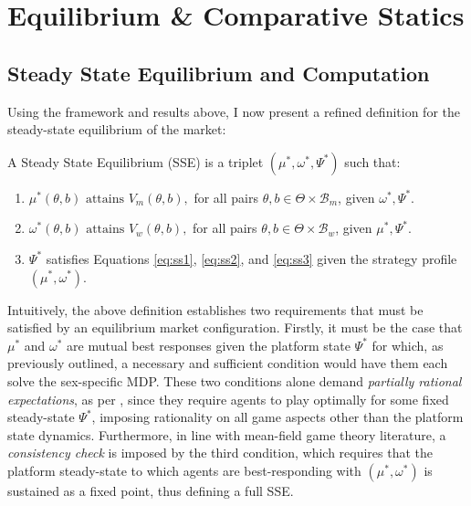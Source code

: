 \section{Equilibrium \& Comparative Statics}
\label{sec:section3} 
\subsection{Steady State Equilibrium and Computation}\label{sec:section3.1} 
Using the framework and results above, I now present a refined definition for the steady-state equilibrium of the market: 
\begin{definition}
    A Steady State Equilibrium (SSE) is a triplet $(\mu^*, \omega^*, \Psi^*)$ such that:
    \begin{enumerate}
        \item $ \mu^*(\theta,b) \text{ attains } V_m(\theta,b),$ for all pairs $\theta, b \in \Theta \times \mathcal{B}_m$, given $\omega^*,\Psi^*$.
        \item $ \omega^*(\theta,b) \text{ attains } V_w(\theta,b),$ for all pairs $\theta, b \in \Theta \times \mathcal{B}_w$, given $\mu^*,\Psi^*$.
        \item $\Psi^*$ satisfies Equations \ref{eq:ss1}, \ref{eq:ss2}, and \ref{eq:ss3} given the strategy profile $(\mu^*, \omega^*)$.
    \end{enumerate} 
\end{definition}

Intuitively, the above definition establishes two requirements that must be satisfied by an equilibrium market configuration. 
Firstly, it must be the case that $\mu^*$ and $\omega^*$ are mutual best responses given the platform state $\Psi^*$ for which, as previously outlined, a necessary and sufficient condition would have them each solve the sex-specific MDP. 
These two conditions alone demand \textit{partially rational expectations}, as per \cite{burdett1997marriage}, since they require agents to play optimally for some fixed steady-state $\Psi^*$, imposing rationality on all game aspects other than the platform state dynamics.  
Furthermore, in line with mean-field game theory literature, a \textit{consistency check} is imposed by the third condition, which requires that the platform steady-state to which agents are best-responding with $(\mu^*,\omega^*)$ is sustained as a fixed point, thus defining a full SSE. 

